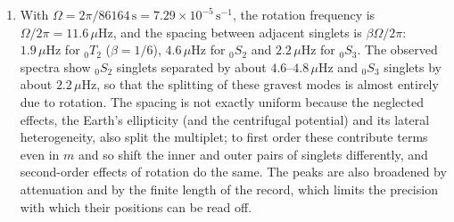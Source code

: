\documentclass[a4paper,10pt]{paper}
\begin{document}
\begin{enumerate}
\begin{enumerate}
\begin{equation*}
    \hat{\mathbf{z}}\times\mathbf{C}_{lm}=-\partial_{\theta}Y(\cos\theta\,\hat{\bm{\theta}}+\sin\theta\,\hat{\mathbf{r}})-\frac{\ii m\cos\theta}{\sin\theta}Y\,\hat{\bm{\varphi}},
\end{equation*}
and therefore
\begin{equation*}
    \mathbf{C}_{lm}^{*}\cdot(\hat{\mathbf{z}}\times\mathbf{C}_{lm})=-\frac{\ii m\cos\theta}{\sin\theta}\left(Y\,\partial_{\theta}Y^{*}+Y^{*}\partial_{\theta}Y\right)
    =-\frac{\ii m\cos\theta}{\sin\theta}\,\partial_{\theta}|Y|^{2}.
\end{equation*}
Integrating over the unit sphere,
\begin{multline*}
    \int_{\mathbb{S}^{2}}\mathbf{C}_{lm}^{*}\cdot(\hat{\mathbf{z}}\times\mathbf{C}_{lm})\dd S=-\ii m\int_{0}^{2\pi}\!\!\int_{0}^{\pi}\cos\theta\,\partial_{\theta}|Y|^{2}\dd\theta\dd\varphi \\
    =-\ii m\left\{2\pi\Big[\cos\theta|Y|^{2}\Big]_{0}^{\pi}+\int_{\mathbb{S}^{2}}|Y|^{2}\dd S\right\}=-\ii m,
\end{multline*}
the boundary term vanishing because $Y$ vanishes at the poles for $m\ne0$, and the remaining integral being unity by orthonormality. Hence
\begin{equation*}
    \langle km|W|km\rangle=2\Omega\int_{0}^{b}\rho W^{2}r^{2}\dd r\int_{\mathbb{S}^{2}}\mathbf{C}_{lm}^{*}\cdot(\hat{\mathbf{z}}\times\mathbf{C}_{lm})\dd S
    =-2\ii m\Omega\int_{0}^{b}\rho W^{2}r^{2}\dd r=-\frac{2\ii m\Omega}{l(l+1)},
\end{equation*}
using the stated normalisation, and so $\beta=1/[l(l+1)]$. (The off-diagonal elements $m'\ne m$ vanish because the integrand is then 
proportional to $\ee^{\ii(m-m')\varphi}$, which integrates to zero.) A check on the spheroidal formula quoted in the question is that the 
same manipulations applied to $\mathbf{s}=U\,Y\hat{\mathbf{r}}+V\nabla_{1}Y$ give the angular integral $-\ii m(2UV+V^{2})$.
\item With $\Omega=2\pi/86164\,\mathrm{s}=7.29\times10^{-5}\,\mathrm{s^{-1}}$, the rotation frequency is $\Omega/2\pi=11.6\,\mu\mathrm{Hz}$, and 
the spacing between adjacent singlets is $\beta\Omega/2\pi$: $1.9\,\mu\mathrm{Hz}$ for ${}_{0}T_{2}$ ($\beta=1/6$), $4.6\,\mu\mathrm{Hz}$ for ${}_{0}S_{2}$ 
and $2.2\,\mu\mathrm{Hz}$ for ${}_{0}S_{3}$. The observed spectra show ${}_{0}S_{2}$ singlets separated by about $4.6$--$4.8\,\mu\mathrm{Hz}$ 
and ${}_{0}S_{3}$ singlets by about $2.2\,\mu\mathrm{Hz}$, so that the splitting of these gravest modes is almost entirely due to rotation. 
The spacing is not exactly uniform because the neglected effects, the Earth's ellipticity (and the centrifugal potential) and its 
lateral heterogeneity, also split the multiplet; to first order these contribute terms even in $m$ and so shift the inner and outer 
pairs of singlets differently, and second-order effects of rotation do the same. The peaks are also broadened by attenuation 
and by the finite length of the record, which limits the precision with which their positions can be read off.
\end{enumerate}

\end{enumerate}
\end{document}
